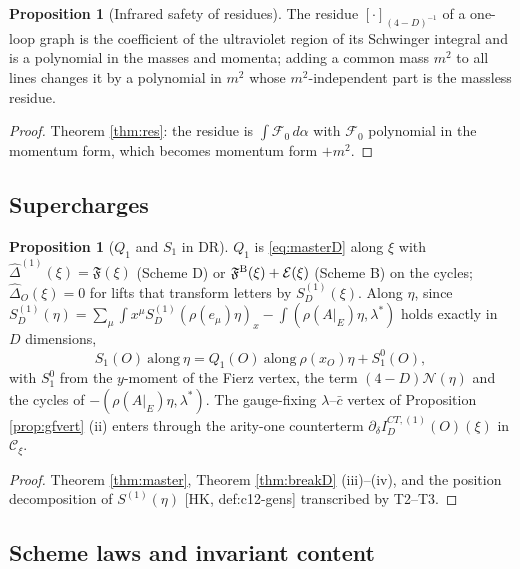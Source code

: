 \documentclass[11pt]{article}
\theoremstyle{definition}
\newtheorem{proposition}[definition]{Proposition}
\numberwithin{equation}{section}
\begin{document}
\begin{proposition}[Infrared safety of residues]
\label{prop:irsafe}
The residue $[\cdot]_{(4-D)^{-1}}$ of a one-loop graph is the coefficient of the ultraviolet region of its Schwinger integral and is a polynomial in the masses and momenta; adding a common mass $m^2$ to all lines changes it by a polynomial in $m^2$ whose $m^2$-independent part is the massless residue.
\end{proposition}

\begin{proof}
Theorem \ref{thm:res}: the residue is $\int\mathcal F_0\,d\alpha$ with $\mathcal F_0$ polynomial in the momentum form, which becomes momentum form $+m^2$.
\end{proof}

\subsection{Supercharges}

\begin{proposition}[$Q_1$ and $S_1$ in DR]
\label{prop:QS}
$Q_1$ is \eqref{eq:masterD} along $\xi$ with $\widehat\Delta^{(1)}(\xi)=\mathfrak F(\xi)$ (Scheme D) or $\mathfrak F^{\rm B}(\xi)+\mathcal E(\xi)$ (Scheme B) on the cycles; $\widehat\Delta_O(\xi)=0$ for lifts that transform letters by $S^{(1)}_D(\xi)$. Along $\eta$, since $S^{(1)}_D(\eta)=\sum_\mu\int x^\mu S^{(1)}_D(\rho(e_\mu)\eta)_x-\int(\rho(A|_E)\eta,\lambda^*)$ holds exactly in $D$ dimensions,
\[
S_1(O)\ \text{along}\ \eta=Q_1(O)\ \text{along}\ \rho(x_O)\eta+S^0_1(O),
\]
with $S^0_1$ from the $y$-moment of the Fierz vertex, the term $(4-D)\mathcal N(\eta)$ and the cycles of $-(\rho(A|_E)\eta,\lambda^*)$. The gauge-fixing $\lambda$--$\bar c$ vertex of Proposition \ref{prop:gfvert} (ii) enters through the arity-one counterterm $\partial_\delta I^{CT,(1)}_D(O)(\xi)$ in $\mathcal C_\xi$.
\end{proposition}

\begin{proof}
Theorem \ref{thm:master}, Theorem \ref{thm:breakD} (iii)--(iv), and the position decomposition of $S^{(1)}(\eta)$ [HK, def:c12-gens] transcribed by T2--T3.
\end{proof}

\subsection{Scheme laws and invariant content}
\end{document}
